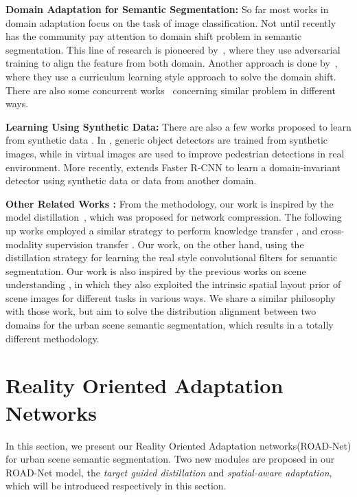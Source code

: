 \documentclass[10pt,twocolumn,letterpaper]{article}
\begin{document}
\textbf{Domain Adaptation for Semantic Segmentation:} So far most works in domain adaptation focus on the task of image classification. Not until recently has the community pay attention to domain shift problem in semantic segmentation. This line of research is pioneered by~\cite{hoffman2016fcns}, where they use adversarial training to align the feature from both domain. Another approach is done by~\cite{zhang2017curriculum}, where they use a curriculum learning style approach to solve the domain shift. There are also some concurrent works~\cite{sankaranarayanan2017unsupervised,saito2017maximum,chen2017no,tsai2018learning} concerning similar problem in different ways.

\textbf{Learning Using Synthetic Data: } There are also a few works proposed to learn from synthetic data \cite{sun2014virtual,xu2016hierarchical,ros2016synthia,vazquez2014virtual,peng2017synthetic,shrivastava2016learning}. In \cite{sun2014virtual}, generic object detectors are trained from synthetic images, while in \cite{vazquez2014virtual} virtual images are used to improve pedestrian detections in real environment. More recently, \cite{chen2018domain} extends Faster R-CNN to learn a domain-invariant detector using synthetic data or data from another domain.

\textbf{Other Related Works :} From the methodology, our work is inspired by the model distillation~\cite{hinton2015distilling}, which was proposed for network compression. The following up works employed a similar strategy to perform knowledge transfer \cite{li2016learning,Wang2017}, and cross-modality supervision transfer \cite{gupta2016cross}. Our work, on the other hand, using the distillation strategy for learning the real style convolutional filters for semantic segmentation. Our work is also inspired by the previous works on scene understanding \cite{lazebnik2006beyond,hoiem2008putting}, in which they also exploited the intrinsic spatial layout prior of scene images for different tasks in various ways. We share a similar philosophy with those work, but aim to solve the distribution alignment between two domains for the urban scene semantic segmentation, which results in a totally different methodology. 

\section{Reality Oriented Adaptation Networks}
In this section, we present our Reality Oriented Adaptation networks(ROAD-Net) for urban scene semantic segmentation. Two new modules are proposed in our ROAD-Net model, the \textit{target guided distillation} and \textit{spatial-aware adaptation}, which will be introduced respectively in this section.
\end{document}
